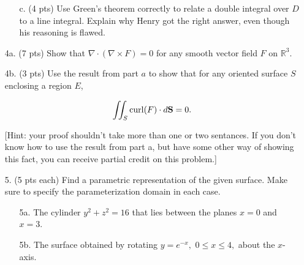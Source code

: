 \documentclass[12 pt]{report}
\begin{document}
\begin{enumerate}
\begin{enumerate}
\vspace{3cm} 

\item[c.] (4 pts) Use Green's theorem correctly to relate a double integral over $D$ to a line integral. Explain why Henry got the right answer, even though his reasoning is flawed. 



\end{enumerate} 

\newpage

\item[4a.] (7 pts) Show that $\nabla \cdot (\nabla \times F) = 0$ for any smooth vector field $F$ on $\mathbb{R}^3$.  

\vspace{13cm}

\item[4b.] (3 pts) Use the result from part $a$ to show that for any oriented surface $S$ enclosing a region $E$,

$$\iint_S \text{curl}(F) \cdot d\bold{S} = 0.$$ 

[Hint: your proof shouldn't take more than one or two sentances. If you don't know how to use the result from part a, but have some other way of showing this fact, you can receive partial credit on this problem.]

\newpage

\item[5.] (5 pts each) Find a parametric representation of the given surface. Make sure to specify the parameterization domain in each case. 

\begin{enumerate} \item[5a.] The cylinder $y^2+z^2 = 16$ that lies between the planes $x = 0$ and $x = 3$. 

\vfill

\item[5b.] The surface obtained by rotating $y = e^{-x},$ $0 \leq x \leq 4,$ about the $x$-axis. 

\vfill

\end{enumerate}

\end{enumerate}
\end{document}
